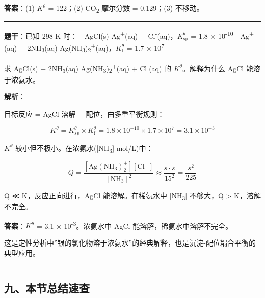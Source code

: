 \textbf{答案}：(1) \(K^\theta\) = 122；(2) CO\textsubscript{2} 摩尔分数 = 0.129；(3) 不移动。

\begin{center}\rule{0.5\linewidth}{0.5pt}\end{center}

\textbf{题干}：已知 298 K 时：
- AgCl(s) \衡 Ag\textsuperscript{+}(aq) + Cl\textsuperscript{-}(aq)，\(K_{\mathrm{sp}}^\theta\) = 1.8 × 10\textsuperscript{-10}
- Ag\textsuperscript{+}(aq) + 2NH\textsubscript{3}(aq) \衡 Ag(NH\textsubscript{3})\textsubscript{2}\textsuperscript{+}(aq)，\(K_{\mathrm f}^\theta\) = 1.7 × 10\textsuperscript{7}

求 AgCl(s) + 2NH\textsubscript{3}(aq) \衡 Ag(NH\textsubscript{3})\textsubscript{2}\textsuperscript{+}(aq) + Cl\textsuperscript{-}(aq) 的 \(K^\theta\)。解释为什么 AgCl 能溶于浓氨水。

\textbf{解析}：

目标反应 = AgCl 溶解 + 配位，由多重平衡规则：

\[K^\theta = K_{sp}^\theta \times K_{\mathrm f}^\theta = 1.8 \times 10^{-10} \times 1.7 \times 10^7 = 3.1 \times 10^{-3}\]

\(K^\theta\) 较小但不极小。在浓氨水({[}NH\textsubscript{3}{]}  mol/L)中：

\[Q = \frac{[\mathrm{Ag(NH_3)_2^+}][\mathrm{Cl^-}]}{[\mathrm{NH_3}]^2} \approx \frac{s \cdot s}{15^2} = \frac{s^2}{225}\]

Q ≪ K，反应正向进行，AgCl 能溶解。在稀氨水中 {[}NH\textsubscript{3}{]} 不够大，Q \textgreater{} K，溶解不完全。

\textbf{答案}：\(K^\theta\) = 3.1 × 10\textsuperscript{-3}。浓氨水中 AgCl 能溶解，稀氨水中溶解不完全。

这是定性分析中''银的氯化物溶于浓氨水''的经典解释，也是沉淀-配位耦合平衡的典型应用。

\begin{center}\rule{0.5\linewidth}{0.5pt}\end{center}

\subsection{九、本节总结速查}\label{ux4e5dux672cux8282ux603bux7ed3ux901fux67e5}

